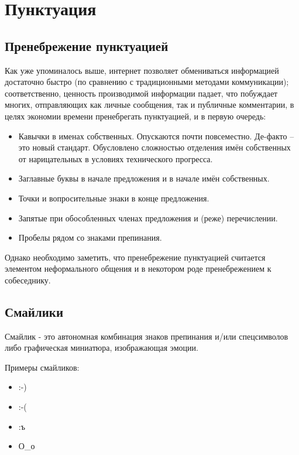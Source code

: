 \section{Пунктуация}

\subsection{Пренебрежение пунктуацией}

Как уже упоминалось выше, интернет позволяет обмениваться информацией достаточно быстро (по сравнению с традиционными методами коммуникации); соответственно, ценность производимой информации падает, что побуждает многих, отправляющих как личные сообщения, так и публичные комментарии, в целях экономии времени пренебрегать пунктуацией, и в первую очередь:

\begin{itemize}

\item Кавычки в именах собственных. Опускаются почти повсеместно. Де-факто -- это новый стандарт. Обусловлено сложностью отделения имён собственных от нарицательных в условиях технического прогресса.

\item Заглавные буквы в начале предложения и в начале имён собственных.

\item Точки и вопросительные знаки в конце предложения.

\item Запятые при обособленных членах предложения и (реже) перечислении.

\item Пробелы рядом со знаками препинания.

\end{itemize}

Однако необходимо заметить, что пренебрежение пунктуацией считается элементом неформального общения и в некотором роде пренебрежением к собеседнику.

\subsection{Смайлики}

\opred
Смайлик - это автономная комбинация знаков препинания и/или спецсимволов либо графическая миниатюра, изображающая эмоции.

Примеры смайликов:

\begin{itemize}

\item :-)

\item :-(

\item :ъ

\item О\_о

\end{itemize}

